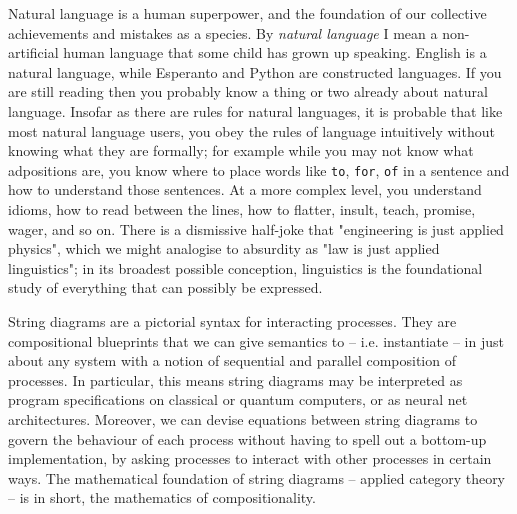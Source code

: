 
Natural language is a human superpower, and the foundation of our collective achievements and mistakes as a species. By \emph{natural language} I mean a non-artificial human language that some child has grown up speaking. English is a natural language, while Esperanto and Python are constructed languages. If you are still reading then you probably know a thing or two already about natural language. Insofar as there are rules for natural languages, it is probable that like most natural language users, you obey the rules of language intuitively without knowing what they are formally; for example while you may not know what adpositions are, you know where to place words like \texttt{to}, \texttt{for}, \texttt{of} in a sentence and how to understand those sentences. At a more complex level, you understand idioms, how to read between the lines, how to flatter, insult, teach, promise, wager, and so on. There is a dismissive half-joke that "engineering is just applied physics", which we might analogise to absurdity as "law is just applied linguistics"; in its broadest possible conception, linguistics is the foundational study of everything that can possibly be expressed.


String diagrams are a pictorial syntax for interacting processes. They are compositional blueprints that we can give semantics to -- i.e. instantiate -- in just about any system with a notion of sequential and parallel composition of processes. In particular, this means string diagrams may be interpreted as program specifications on classical or quantum computers, or as neural net architectures. Moreover, we can devise equations between string diagrams to govern the behaviour of each process without having to spell out a bottom-up implementation, by asking processes to interact with other processes in certain ways. The mathematical foundation of string diagrams -- applied category theory -- is in short, the mathematics of compositionality.\\

